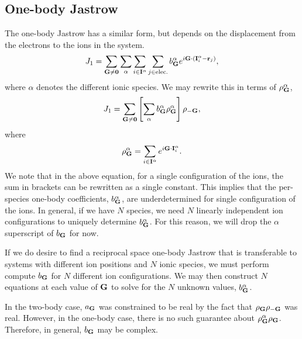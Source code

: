 \subsection{One-body Jastrow}
The one-body Jastrow has a similar form, but depends on the
displacement from the electrons to the ions in the system.
\begin{equation}
J_1 = \sum_{\mathbf{G}\neq\mathbf{0}} \sum_{\alpha}
\sum_{i\in\mathbf{I}^\alpha}\sum_{j\in\text{elec.}} b^{\alpha}_{\mathbf{G}}
  e^{i\mathbf{G}\cdot(\mathbf{I}^{\alpha}_i - \mathbf{r}_j)},
\end{equation}
where $\alpha$ denotes the different ionic species.
We may rewrite this in terms of $\rho^{\alpha}_{\mathbf{G}}$, 
\begin{equation}
J_1 = \sum_{\mathbf{G}\neq\mathbf{0}} \left[\sum_\alpha b^\alpha_{\mathbf{G}}
  \rho_{\mathbf{G}}^\alpha\right] \rho_{-\mathbf{G}},
\end{equation}
where
\begin{equation}
\rho^\alpha_{\mathbf{G}} = \sum_{i\in\mathbf{I}^\alpha} e^{i\mathbf{G}\cdot\mathbf{I}^\alpha_i}.
\end{equation}
We note that in the above equation, for a single configuration of the
ions, the sum in brackets can be rewritten as a single constant.  This
implies that the per-species one-body coefficients, $b^\alpha_{\mathbf{G}}$, are
underdetermined for single configuration of the ions.  In general, if
we have $N$ species, we need $N$ linearly independent ion
configurations to uniquely determine $b^{\alpha}_{\mathbf{G}}$.  For this
reason, we will drop the $\alpha$ superscript of $b_{\mathbf{G}}$ for now.  

If we do desire to find a reciprocal space one-body Jastrow that is
transferable to systems with different ion positions and $N$ 
ionic species, we must perform compute $b_{\mathbf{G}}$ for $N$ different ion
configurations.  We may then construct $N$ equations at each value of
$\mathbf{G}$ to solve for the $N$ unknown values, $b^\alpha_{\mathbf{G}}$.

In the two-body case, $a_{\mathbf{G}}$ was constrained to be real by the fact
that $\rho_{\mathbf{G}} \rho_{-\mathbf{G}}$ was real.  However, in the one-body case,
there is no such guarantee about $\rho^\alpha_{\mathbf{G}} \rho_{\mathbf{G}}$.
Therefore, in general, $b_{\mathbf{G}}$ may be complex.

